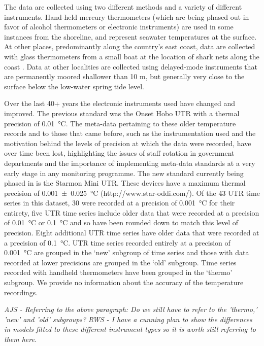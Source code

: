 \documentclass{ametsoc}
\begin{document}
The data are collected using two different methods and a variety of different instruments. Hand-held mercury thermometers (which are being phased out in favor of alcohol thermometers or electronic instruments) are used in some instances from the shoreline, and represent seawater temperatures at the surface. At other places, predominantly along the country's east coast, data are collected with glass thermometers from a small boat at the location of shark nets along the coast \citep{Cliff1988}. Data at other localities are collected using delayed-mode instruments that are permanently moored shallower than 10 m, but generally very close to the surface below the low-water spring tide level.

Over the last 40+ years the electronic instruments used have changed and improved. The previous standard was the Onset Hobo UTR with a thermal precision of \SI{0.01}{\degreeCelsius}. The meta-data pertaining to these older temperature records and to those that came before, such as the instrumentation used and the motivation behind the levels of precision at which the data were recorded, have over time been lost, highlighting the issues of staff rotation in government departments and the importance of implementing meta-data standards at a very early stage in any monitoring programme. The new standard currently being phased in is the Starmon Mini UTR. These devices have a maximum thermal precision of \SI[separate-uncertainty = true, multi-part-units = repeat]{0.001(25)}{\degreeCelsius} (http://www.star-oddi.com/). Of the 43 UTR time series in this dataset, 30 were recorded at a precision of \SI{0.001}{\degreeCelsius} for their entirety, five UTR time series include older data that were recorded at a precision of \SI{0.01}{\degreeCelsius} or \SI{0.1}{\degreeCelsius} and so have been rounded down to match this level of precision. Eight additional UTR time series have older data that were recorded at a precision of \SI{0.1}{\degreeCelsius}. UTR time series recorded entirely at a precision of \SI{0.001}{\degreeCelsius} are grouped in the `new' subgroup of time series and those with data recorded at lower precisions are grouped in the `old' subgroup. Time series recorded with handheld thermometers have been grouped in the `thermo' subgroup. We provide no information about the accuracy of the temperature recordings.

\emph{AJS - Referring to the above paragraph: Do we still have to refer to the 'thermo,' 'new' and 'old' subgroups?}
\emph{RWS - I have a cunning plan to show the differences in models fitted to these different instrument types so it is worth still referring to them here.}
\end{document}
